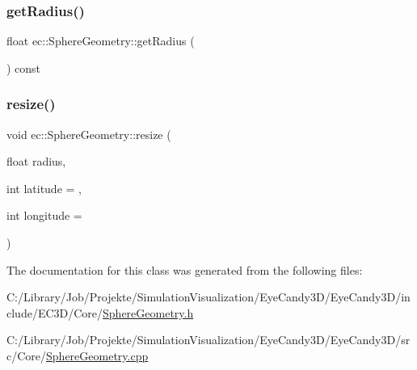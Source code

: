 \mbox{\label{classec_1_1_sphere_geometry_a297fbaec8341dbb2dd0023b0d90d4e24}} 
\subsubsection{\texorpdfstring{get\+Radius()}{getRadius()}}
{\footnotesize\ttfamily float ec\+::\+Sphere\+Geometry\+::get\+Radius (\begin{DoxyParamCaption}{ }\end{DoxyParamCaption}) const}

\mbox{\label{classec_1_1_sphere_geometry_a44eb0096b6f9c6a98a7c325032c04c41}} 
\subsubsection{\texorpdfstring{resize()}{resize()}}
{\footnotesize\ttfamily void ec\+::\+Sphere\+Geometry\+::resize (\begin{DoxyParamCaption}\item[{float}]{radius,  }\item[{int}]{latitude = {},  }\item[{int}]{longitude = {} }\end{DoxyParamCaption})}



The documentation for this class was generated from the following files\+:\begin{DoxyCompactItemize}
\item 
C\+:/\+Library/\+Job/\+Projekte/\+Simulation\+Visualization/\+Eye\+Candy3\+D/\+Eye\+Candy3\+D/include/\+E\+C3\+D/\+Core/\mbox{\hyperlink{_sphere_geometry_8h}{Sphere\+Geometry.\+h}}\item 
C\+:/\+Library/\+Job/\+Projekte/\+Simulation\+Visualization/\+Eye\+Candy3\+D/\+Eye\+Candy3\+D/src/\+Core/\mbox{\hyperlink{_sphere_geometry_8cpp}{Sphere\+Geometry.\+cpp}}\end{DoxyCompactItemize}
